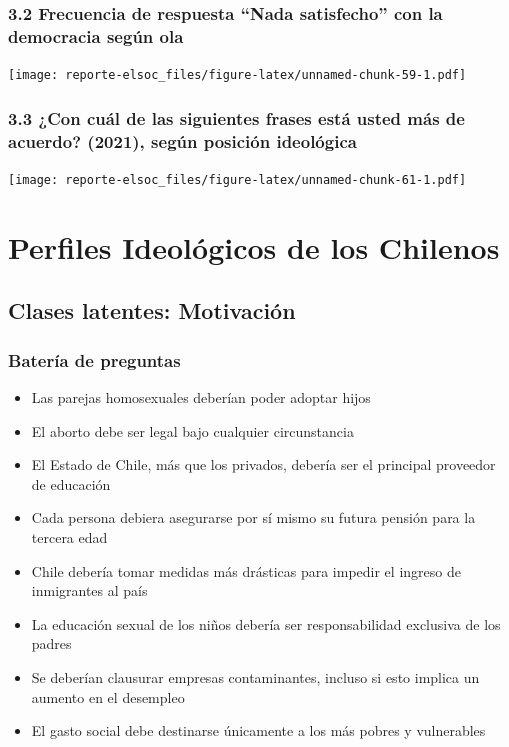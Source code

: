\documentclass[
  12pt,
  openany]{book}
\providecommand{\tightlist}{%
  \setlength{\itemsep}{0pt}\setlength{\parskip}{0pt}}
\begin{document}
\hypertarget{frecuencia-de-respuesta-nada-satisfecho-con-la-democracia-seguxfan-ola}{%
\subsection{3.2 Frecuencia de respuesta ``Nada satisfecho'' con la democracia según ola}\label{frecuencia-de-respuesta-nada-satisfecho-con-la-democracia-seguxfan-ola}}

\texttt{[image: reporte-elsoc\_files/figure-latex/unnamed-chunk-59-1.pdf]}

\hypertarget{con-cuuxe1l-de-las-siguientes-frases-estuxe1-usted-muxe1s-de-acuerdo-2021-seguxfan-posiciuxf3n-ideoluxf3gica}{%
\subsection{3.3 ¿Con cuál de las siguientes frases está usted más de acuerdo? (2021), según posición ideológica}\label{con-cuuxe1l-de-las-siguientes-frases-estuxe1-usted-muxe1s-de-acuerdo-2021-seguxfan-posiciuxf3n-ideoluxf3gica}}

\texttt{[image: reporte-elsoc\_files/figure-latex/unnamed-chunk-61-1.pdf]}

\hypertarget{perfiles-ideoluxf3gicos-de-los-chilenos}{%
\chapter{Perfiles Ideológicos de los Chilenos}\label{perfiles-ideoluxf3gicos-de-los-chilenos}}

\hypertarget{clases-latentes-motivaciuxf3n}{%
\section{Clases latentes: Motivación}\label{clases-latentes-motivaciuxf3n}}

\hypertarget{bateruxeda-de-preguntas}{%
\subsection{Batería de preguntas}\label{bateruxeda-de-preguntas}}

\begin{itemize}
\tightlist
\item
  Las parejas homosexuales deberían poder adoptar hijos
\item
  El aborto debe ser legal bajo cualquier circunstancia
\item
  El Estado de Chile, más que los privados, debería ser el principal proveedor de educación
\item
  Cada persona debiera asegurarse por sí mismo su futura pensión para la tercera edad
\item
  Chile debería tomar medidas más drásticas para impedir el ingreso de inmigrantes al país
\item
  La educación sexual de los niños debería ser responsabilidad exclusiva de los padres
\item
  Se deberían clausurar empresas contaminantes, incluso si esto implica un aumento en el desempleo
\item
  El gasto social debe destinarse únicamente a los más pobres y vulnerables
\end{itemize}
\end{document}

